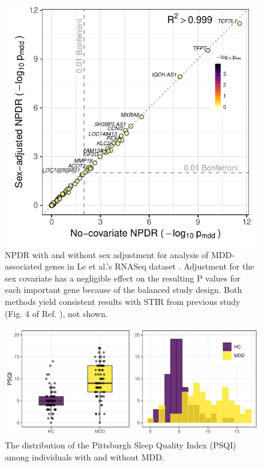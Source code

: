 \documentclass{article}
\begin{document}
\begin{figure}[h]%
\centerline{\includegraphics[]{../figs/jerzy_npdrs_mdd.pdf}}
\caption{NPDR with and without sex adjustment for analysis of MDD-associated genes in Le et al.'s RNASeq dataset \cite{le18}. Adjustment for the sex covariate has a negligible effect on the resulting P values for each important gene because of the balanced study design. Both methods yield consistent results with STIR from previous study (Fig. 4 of Ref. \cite{stir}), not shown.}
\label{fig:jerzy_npdrs_mdd}
\end{figure}

\begin{figure}[h]%
\centerline{\includegraphics[]{../figs/psqi_plots.pdf}}
\caption{The distribution of the Pittsburgh Sleep Quality Index (PSQI) among individuals with and without MDD.}
\label{fig:psqi_plots}
\end{figure}



\end{document}
